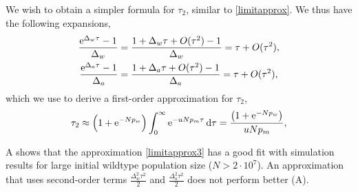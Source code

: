 \documentclass[12pt]{extarticle}
\renewcommand{\d}[1]{\ensuremath{\operatorname{d}\!{#1}}}
\renewcommand{\d}{{\rm d}}
\newcommand{\e}{{\rm e}}
\newcommand{\erfc}{{\rm erfc}}
\begin{document}
We wish to obtain a simpler formula for $\tau_2$, similar to \cref{limitapprox}.
We thus have the following expansions,
%
\begin{align*}
\frac{\e^{\Delta_w\tau}-1}{\Delta_w}&=\frac{1+\Delta_w\tau+O(\tau^2)-1}{\Delta_w}=\tau+O(\tau^2),\\
\frac{\e^{\Delta_a\tau}-1}{\Delta_a}&=\frac{1+\Delta_a\tau+O(\tau^2)-1}{\Delta_a}=\tau+O(\tau^2),
\end{align*}
which we use to derive a first-order approximation for $\tau_2$,
\begin{align}\label{limitapprox3}
\tau_2 \approx
\left(1+\e^{-Np_w}\right)\int_0^\infty\e^{-uNp_m\tau}\,\d\tau=\frac{\left(1+\e^{-Np_w}\right)}{uNp_m} ,
\end{align}

A shows that the approximation \cref{limitapprox3} has a good fit with simulation results for large initial wildtype population size ($N > 2\cdot10^7$). An approximation that uses second-order terms $\frac{\Delta_w^2\tau^2}{2}$ and $\frac{\Delta_a^2\tau^2}{2}$ does not perform better (A).
\end{document}
